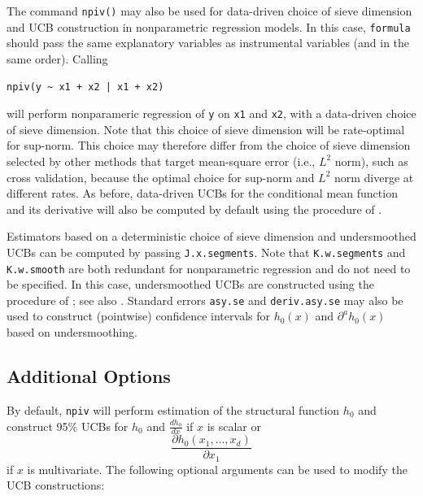 \documentclass[
]{jss}
\begin{document}
The command \texttt{npiv()} may also be used for data-driven choice of
sieve dimension and UCB construction in nonparametric regression models.
In this case, \texttt{formula} should pass the same explanatory
variables as instrumental variables (and in the same order). Calling

\begin{verbatim}
npiv(y ~ x1 + x2 | x1 + x2)
\end{verbatim}

will perform nonparameric regression of \texttt{y} on \texttt{x1} and
\texttt{x2}, with a data-driven choice of sieve dimension. Note that
this choice of sieve dimension will be rate-optimal for sup-norm. This
choice may therefore differ from the choice of sieve dimension selected
by other methods that target mean-square error (i.e., \(L^2\) norm),
such as cross validation, because the optimal choice for sup-norm and
\(L^2\) norm diverge at different rates. As before, data-driven UCBs for
the conditional mean function and its derivative will also be computed
by default using the procedure of \citet{CCK}.

Estimators based on a deterministic choice of sieve dimension and
undersmoothed UCBs can be computed by passing \texttt{J.x.segments}.
Note that \texttt{K.w.segments} and \texttt{K.w.smooth} are both
redundant for nonparametric regression and do not need to be specified.
In this case, undersmoothed UCBs are constructed using the procedure of
\citet{CCQE}; see also \citet{BCCK}. Standard errors \texttt{asy.se} and
\texttt{deriv.asy.se} may also be used to construct (pointwise)
confidence intervals for \(h_0(x)\) and \(\partial^a h_0(x)\) based on
undersmoothing.

\hypertarget{additional-options}{%
\subsection{Additional Options}\label{additional-options}}

By default, \texttt{npiv} will perform estimation of the structural
function \(h_0\) and construct 95\% UCBs for \(h_0\) and
\(\frac{d h_0}{dx}\) if \(x\) is scalar or \[
 \frac{\partial h_0(x_1,\ldots,x_d)}{\partial x_1}
\] if \(x\) is multivariate. The following optional arguments can be
used to modify the UCB constructions:
\end{document}
